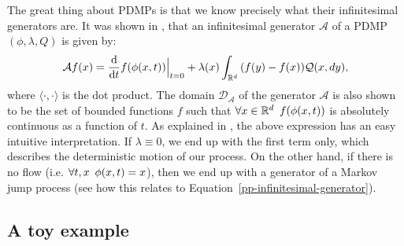 \documentclass[report.tex]{subfiles}
\begin{document}
The great thing about PDMPs is that we know precisely what their infinitesimal
generators are. It was shown in \cite[Section 26]{davis1993markov}, that an
infinitesimal generator $\mathcal{A}$ of a PDMP $(\phi, \lambda, Q)$ is given by:
\begin{equation}
  \label{pdmp-infinitesimal-generator}
  \mathcal{A}f(x) = \dv{}{t}f(\phi(x, t)) \Bigr|_{t = 0} +
    \lambda(x) \int_{{\mathbb{R}^{d}}}^{{}} {}{(f(y) - f(x))\mathcal{Q}(x, dy)},
\end{equation}
where $\langle \cdot,\cdot \rangle$ is the dot product.
The domain $\mathcal{D}_{\mathcal{A}}$ of the generator $\mathcal{A}$
is also shown to be the set of bounded functions $f$ such that
$\forall x \in \mathbb{R}^{d} \enskip f(\phi(x, t))$ is absolutely continuous
as a function of $t$.
As explained in \cite{davis1993markov}, the above expression has an easy
intuitive interpretation.
If $\lambda \equiv 0$, we end up with the first term only, which describes
the deterministic motion of our process. On the other hand, if there is no flow
(i.e. $\forall t,x \enskip \phi(x, t) = x$), then we end up with a generator of
a Markov jump process (see how this relates to Equation~\ref{pp-infinitesimal-generator}).

\subsection{A toy example}
\label{pdmp-toy-example-section}
\end{document}
